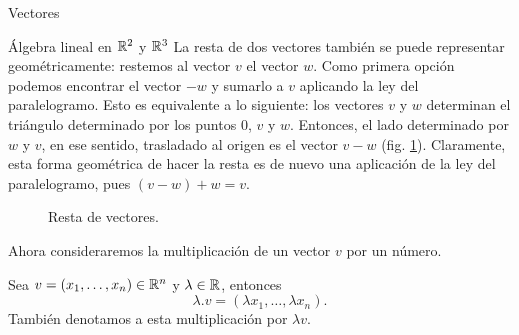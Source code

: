 \begin{chapter}{Vectores}
\begin{section}{\'Algebra lineal en $\mathbb R^2$ y $\mathbb R^3$}
    La resta de dos vectores también se puede representar geométricamente: restemos  al vector $v$ el vector $w$. Como primera opción podemos encontrar el  vector $-w$ y sumarlo  a $v$ aplicando la ley del paralelogramo. Esto es equivalente a lo siguiente: los vectores $v$ y $w$ determinan el triángulo determinado por los puntos $0$, $v$ y $w$. Entonces,  el lado determinado por $w$ y $v$,  en ese sentido, trasladado al origen es el vector $v-w$  (fig. \ref{fig-resta-de-vectores}). Claramente, esta forma geométrica de hacer la resta  es de nuevo una aplicación de la ley del paralelogramo, pues $(v-w)+ w= v$.
    \begin{figure}[h]
    	\centering
        \caption{Resta de vectores.}\label{fig-resta-de-vectores}
    \end{figure}
    
    

    Ahora consideraremos la multiplicación de un vector $v$ por un número. 
    
    \begin{definicion}\label{def-producto-escalar-x-rn}
        Sea $v = (x_1,\ldots,x_n) \in \mathbb R^n$ y $\lambda \in \mathbb R$, entonces
        \begin{equation*}
            \lambda.v = (\lambda x_1,\ldots,\lambda x_n).
        \end{equation*}  
        También denotamos a esta multiplicación por $\lambda v$.
    \end{definicion}


\end{section}
\end{chapter}
